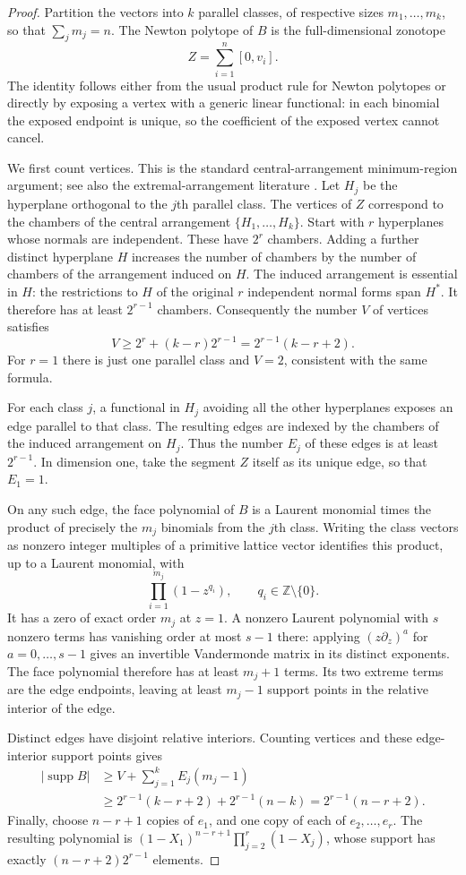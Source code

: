 \documentclass[11pt]{article}
\theoremstyle{definition}
\theoremstyle{remark}
\numberwithin{equation}{section}
\begin{document}
\begin{proof}
Partition the vectors into $k$ parallel classes, of respective sizes
$m_1,\ldots,m_k$, so that $\sum_jm_j=n$. The Newton polytope of $B$ is
the full-dimensional zonotope
\[
 Z=\sum_{i=1}^n[0,v_i].
\]
The identity follows either from the usual product rule for Newton
polytopes or directly by exposing a vertex with a generic linear
functional: in each binomial the exposed endpoint is unique, so the
coefficient of the exposed vertex cannot cancel.

We first count vertices. This is the standard central-arrangement
minimum-region argument; see also the extremal-arrangement literature
\cite{Zaslavsky}. Let $H_j$ be the hyperplane orthogonal to the
$j$th parallel class. The vertices of $Z$ correspond to the chambers of
the central arrangement $\{H_1,\ldots,H_k\}$. Start with $r$ hyperplanes
whose normals are independent. These have $2^r$ chambers. Adding a
further distinct hyperplane $H$ increases the number of chambers by the
number of chambers of the arrangement induced on $H$. The induced
arrangement is essential in $H$: the restrictions to $H$ of the original
$r$ independent normal forms span $H^*$. It therefore has at least
$2^{r-1}$ chambers. Consequently the number $V$ of vertices satisfies
\[
 V\ge 2^r+(k-r)2^{r-1}
   =2^{r-1}(k-r+2).
\]
For $r=1$ there is just one parallel class and $V=2$, consistent with
the same formula.

For each class $j$, a functional in $H_j$ avoiding all the other
hyperplanes exposes an edge parallel to that class. The resulting
edges are indexed by the chambers of the induced arrangement on $H_j$.
Thus the number $E_j$ of these edges is at least $2^{r-1}$. In dimension
one, take the segment $Z$ itself as its unique edge, so that $E_1=1$.

On any such edge, the face polynomial of $B$ is a Laurent monomial times
the product of precisely the $m_j$ binomials from the $j$th class.
Writing the class vectors as nonzero integer multiples of a primitive
lattice vector identifies this product, up to a Laurent monomial, with
\[
 \prod_{i=1}^{m_j}(1-z^{q_i}),\qquad q_i\in\mathbb Z\setminus\{0\}.
\]
It has a zero of exact order $m_j$ at $z=1$. A nonzero Laurent
polynomial with $s$ nonzero terms has vanishing order at most $s-1$
there: applying $(z\partial_z)^a$ for $a=0,\ldots,s-1$ gives an
invertible Vandermonde matrix in its distinct exponents. The face
polynomial therefore has at least $m_j+1$ terms. Its two extreme terms
are the edge endpoints, leaving at least $m_j-1$ support points in the
relative interior of the edge.

Distinct edges have disjoint relative interiors. Counting vertices and
these edge-interior support points gives
\begin{align*}
 |\operatorname{supp}B|
 &\ge V+\sum_{j=1}^kE_j(m_j-1)\\
 &\ge 2^{r-1}(k-r+2)+2^{r-1}(n-k)
  =2^{r-1}(n-r+2).
\end{align*}
Finally, choose $n-r+1$ copies of $e_1$, and one copy of each of
$e_2,\ldots,e_r$. The resulting polynomial is
$(1-X_1)^{n-r+1}\prod_{j=2}^r(1-X_j)$, whose support has exactly
$(n-r+2)2^{r-1}$ elements.
\end{proof}
\end{document}
